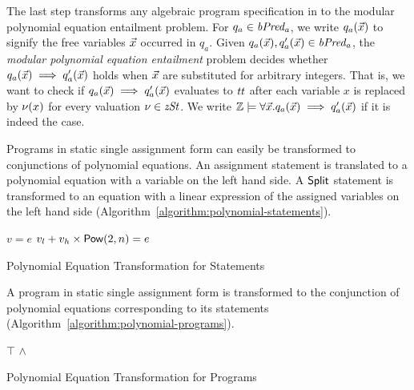 
The last step transforms any algebraic program specification in \zdsl to the
modular polynomial equation entailment problem. For
$q_a \in \mathit{bPred_a}$, we write $q_a(\vec{x})$ to signify the free variables $\vec{x}$
occurred in $q_a$. Given $q_a(\vec{x}), q_a'(\vec{x}) \in \mathit{bPred_a}$, the \emph{modular
  polynomial equation entailment} problem decides whether
$q_a(\vec{x}) \implies q_a'(\vec{x})$ holds when $\vec{x}$ are substituted for
arbitrary integers. That is, we want to check if $q_a(\vec{x}) \implies
q_a'(\vec{x})$ evaluates to $\mathit{tt}$ after each variable $x$ is replaced by
$\nu(x)$ for every valuation $\nu \in \mathit{zSt}$. We write $\mathbb{Z} \models
\forall \vec{x}. q_a(\vec{x}) \implies q_a'(\vec{x})$ if it is indeed the case.

Programs in static single assignment form can easily be transformed to
conjunctions of polynomial equations. An assignment statement is
translated to a polynomial equation with a variable on the left hand side.
A $\mbox{\textsf{Split}}$ statement is transformed to an
equation with a linear expression of the assigned variables on the
left hand side (Algorithm~\ref{algorithm:polynomial-statements}).
\begin{algorithm}
  \begin{algorithmic}[1]
        \Return $v = e$
      \EndCase
        \Return $v_l + v_h \times \mbox{\textsf{Pow}}(2, n) = e$
      \EndCase
    \EndMatch
    \EndFunction
  \end{algorithmic}
  \caption{Polynomial Equation Transformation for Statements}
  \label{algorithm:polynomial-statements}
\end{algorithm}

A program in static single assignment form is transformed to the
conjunction of polynomial equations corresponding to its statements
(Algorithm~\ref{algorithm:polynomial-programs}).

\begin{algorithm}
  \begin{algorithmic}[1]
      \Case{$\epsilon$} \Return $\top$ \EndCase
        \Return {} $\wedge$
      \EndCase
    \EndMatch
    \EndFunction
  \end{algorithmic}
  \caption{Polynomial Equation Transformation for Programs}
  \label{algorithm:polynomial-programs}
\end{algorithm}

